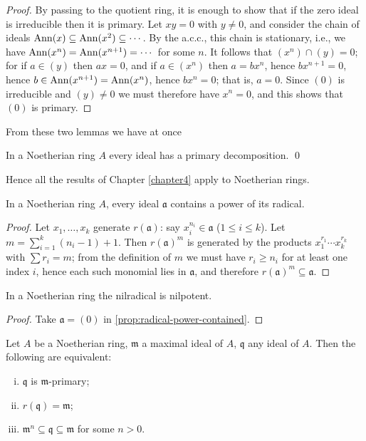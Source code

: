 \begin{proof}
By passing to the quotient ring, it is enough to show that if the zero ideal is irreducible then it is primary. Let $xy = 0$ with $y \neq 0$, and consider the chain of ideals $\operatorname{Ann}(x) \subseteq \operatorname{Ann}(x^2) \subseteq \cdots$. By the a.c.c., this chain is stationary, i.e., we have $\operatorname{Ann}(x^n) = \operatorname{Ann}(x^{n+1}) = \cdots$ for some $n$. It follows that $(x^n) \cap (y) = 0$; for if $a \in (y)$ then $ax = 0$, and if $a \in (x^n)$ then $a = bx^n$, hence $bx^{n+1} = 0$, hence $b \in \operatorname{Ann}(x^{n+1}) = \operatorname{Ann}(x^n)$, hence $bx^n = 0$; that is, $a = 0$. Since $(0)$ is irreducible and $(y) \neq 0$ we must therefore have $x^n = 0$, and this shows that $(0)$ is primary.
\end{proof}

From these two lemmas we have at once

\begin{theorem}\label{thm:lasker-noether}
In a Noetherian ring $A$ every ideal has a primary decomposition. \qed
\end{theorem}

Hence all the results of Chapter \ref{chapter4} apply to Noetherian rings.

\begin{proposition}\label{prop:radical-power-contained}
In a Noetherian ring $A$, every ideal $\mathfrak{a}$ contains a power of its radical.
\end{proposition}

\begin{proof}
Let $x_1, \ldots, x_k$ generate $r(\mathfrak{a})$: say $x_i^{n_i} \in \mathfrak{a}$ ($1 \leq i \leq k$). Let $m = \sum_{i=1}^k (n_i - 1) + 1$. Then $r(\mathfrak{a})^m$ is generated by the products $x_1^{r_1} \cdots x_k^{r_k}$ with $\sum r_i = m$; from the definition of $m$ we must have $r_i \geq n_i$ for at least one index $i$, hence each such monomial lies in $\mathfrak{a}$, and therefore $r(\mathfrak{a})^m \subseteq \mathfrak{a}$.
\end{proof}

\begin{corollary}\label{cor:nilradical-nilpotent}
In a Noetherian ring the nilradical is nilpotent.
\end{corollary}

\begin{proof}
Take $\mathfrak{a} = (0)$ in \eqref{prop:radical-power-contained}.
\end{proof}

\begin{corollary}\label{cor:m-primary-equivalent}
Let $A$ be a Noetherian ring, $\mathfrak{m}$ a maximal ideal of $A$, $\mathfrak{q}$ any ideal of $A$. Then the following are equivalent:
\begin{enumerate}[i)]
    \item $\mathfrak{q}$ is $\mathfrak{m}$-primary;
    \item $r(\mathfrak{q}) = \mathfrak{m}$;
    \item $\mathfrak{m}^n \subseteq \mathfrak{q} \subseteq \mathfrak{m}$ for some $n > 0$.
\end{enumerate}
\end{corollary}

